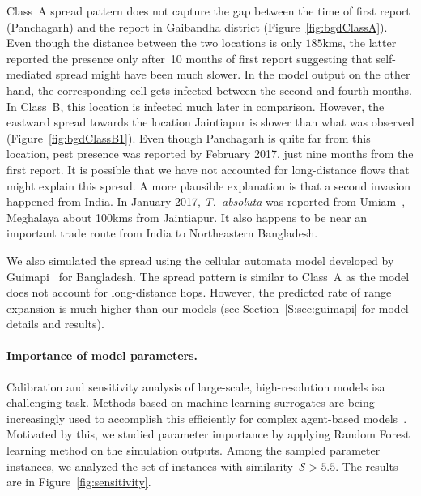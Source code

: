 \documentclass[11pt]{article}
\newcommand{\tuta}{\emph{T.~absoluta}}
\newcommand{\similarity}{\mathcal{S}}
\theoremstyle{definition}
\begin{document}
Class~A spread pattern does not capture the gap between the time of first
report (Panchagarh) and the report in Gaibandha district
(Figure~\ref{fig:bgdClassA}). Even though the distance between the two
locations is only $185$kms, the latter reported the presence only after~10
months of first report suggesting that self-mediated spread might have been
much slower. In the model output on the other hand, the corresponding cell
gets infected between the second and fourth months.  In Class~B, this
location is infected much later in comparison. However, the eastward spread
towards the location Jaintiapur is slower than what was observed
(Figure~\ref{fig:bgdClassB1}). Even though Panchagarh is quite far from
this location, pest presence was reported by February 2017, just nine
months from the first report. It is possible that we have not accounted for
long-distance flows that might explain this spread. A more plausible
explanation is that a second invasion happened from India. In January 2017,
\tuta{} was reported from Umiam~\cite{sankarganesh2017}, Meghalaya about
100kms from Jaintiapur.  It also happens to be near an important trade
route from India to Northeastern Bangladesh.

We also simulated the spread using the cellular automata model developed by
Guimapi~\cite{guimapi2016modeling} for Bangladesh. The spread pattern is
similar to Class~A as the model does not account for long-distance
hops. However, the predicted rate of range expansion is much higher than
our models (see Section~\ref{S:sec:guimapi} for model details and results).


\paragraph{Importance of model parameters.} 
Calibration and sensitivity analysis of large-scale, high-resolution models
isa challenging task. Methods based on machine learning
surrogates are being increasingly used to accomplish this efficiently for
complex agent-based models~\cite{lamperti2018agent}. Motivated by this, we
studied parameter importance by applying Random Forest learning method on
the simulation outputs. Among the sampled parameter instances, we analyzed
the set of instances with similarity~$\similarity>5.5$. The results are in
Figure~\ref{fig:sensitivity}. 
\end{document}
